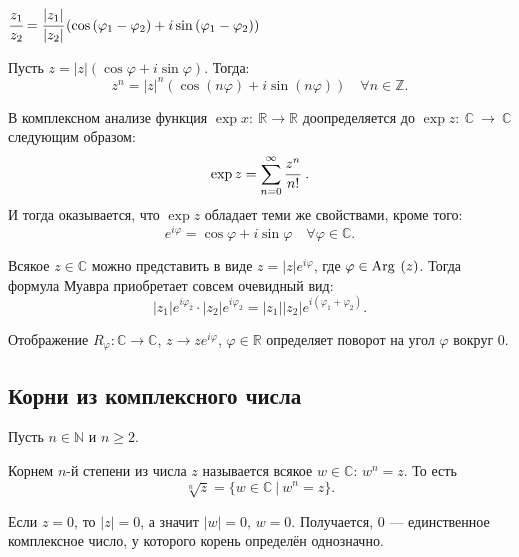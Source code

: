 \begin{Consequence}
$\cfrac{z_1}{z_2} = \cfrac{|z_1|}{|z_2|}\left(\cos\left(\varphi_1-\varphi_2\right) + i\sin\left(\varphi_1 - \varphi_2\right)\right)$
\end{Consequence}

\begin{Consequence}
Пусть $z = |z|\left(\cos\varphi + i \sin \varphi\right)$. Тогда:
\[z^n = |z|^n\left(\cos\left(n\varphi\right)+i\sin\left(n\varphi\right)\right) \quad \forall n \in \mathbb{Z}.
\]
\end{Consequence}

\begin{Comment}
В комплексном анализе функция $\exp x\colon\ \mathbb{R} \rightarrow \mathbb{R}$ доопределяется до $\exp z\colon \ \mathbb{C}~\rightarrow~\mathbb{C}$ следующим образом:
\[
\exp z =\sum\limits_{n=0}^{\infty}\cfrac{z^n}{n!}\ .
\]
И тогда оказывается, что $\exp z$ обладает теми же свойствами, кроме того:
\[
e^{i\varphi} = \cos\varphi + i\sin\varphi \quad \forall \varphi \in \mathbb{C}.
\]
\end{Comment}

Всякое $z \in \mathbb{C}$ можно представить в виде $z = |z|e^{i\varphi}$, где $\varphi \in \mathrm{Arg\:}\left(z\right)$. Тогда формула Муавра приобретает совсем очевидный вид:
\[
|z_1|e^{i\varphi_2}\cdot|z_2|e^{i\varphi_2} = |z_1||z_2|e^{i\left(\varphi_1+\varphi_2\right)}.
\]

\begin{Comment}
Отображение $R_\varphi \colon \mathbb{C}\rightarrow\mathbb{C}$, $z\rightarrow ze^{i\varphi}$, $\varphi \in \mathbb{R}$ определяет поворот на угол $\varphi$ вокруг $0$.
\end{Comment}

\subsection{Корни из комплексного числа}

Пусть $n\in\mathbb N$ и $n\geqslant2$.

\begin{Def}
Корнем $n$-й степени из числа $z$ называется всякое $w\in\mathbb C$: $w^n=z$. То есть
\[
\sqrt[n]{z} = \{w\in\mathbb C\ |\ w^n = z\}.
\]
\end{Def}

Если $z=0$, то $|z| = 0$, а значит $|w| = 0$, $w=0$. Получается, 0 --- единственное комплексное число, у которого корень определён однозначно. 


